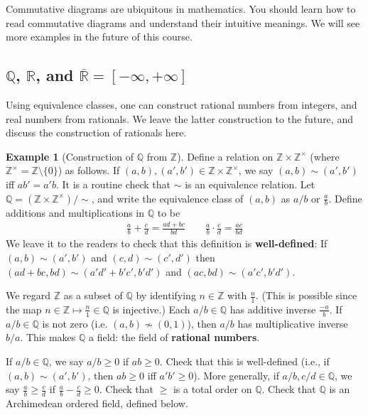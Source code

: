 \documentclass[12pt,b5paper,notitlepage]{article}
\theoremstyle{definition}
\newtheorem{eg}[df]{Example}
\theoremstyle{plain}
\newcommand{\Zbb}{\mathbb Z}
\newcommand{\Qbb}{\mathbb Q}
\newcommand{\Rbb}{\mathbb R}
\numberwithin{equation}{section}
\begin{document}
Commutative diagrams are ubiquitous in mathematics. You should learn how to read commutative diagrams and understand their intuitive meanings. We will see more examples in the future of this course.



\subsection{$\Qbb$, $\Rbb$, and $\overline{\mathbb R}=[-\infty,+\infty]$}



Using equivalence classes, one can construct rational numbers from integers, and real numbers from rationals. We leave the latter construction to the future, and discuss the construction of rationals here.

\begin{eg}[Construction of $\Qbb$ from $\Zbb$]\label{lb17}
Define a relation on $\Zbb\times\Zbb^\times$ (where $\Zbb^\times=\Zbb\setminus\{0\}$) as follows. If $(a,b),(a',b')\in\Zbb\times\Zbb^\times$, we say $(a,b)\sim(a',b')$ iff $ab'=a'b$. It is a routine check that $\sim$ is an equivalence relation. Let \index{Q@$\Qbb$, the field of rational numbers}  $\Qbb=(\Zbb\times\Zbb^\times)/\sim$, and write the equivalence class of $(a,b)$ as $a/b$ or $\frac ab$. Define additions and multiplications in $\Qbb$ to be
\begin{align*}
\frac ab+\frac cd=\frac{ad+bc}{bd}\qquad \frac ab\cdot\frac cd=\frac{ac}{bd}
\end{align*}
We leave it to the readers to check that this definition is  \textbf{well-defined}: If $(a,b)\sim(a',b')$ and $(c,d)\sim(c',d')$ then $(ad+bc,bd)\sim(a'd'+b'c',b'd')$ and $(ac,bd)\sim(a'c',b'd')$.

We regard $\Zbb$ as a subset of $\Qbb$ by identifying $n\in\Zbb$ with $\frac n1$. (This is possible since the map $n\in\Zbb\mapsto \frac n1\in\Qbb$ is injective.) Each $a/b\in\Qbb$ has additive inverse $\frac{-a}b$. If $a/b\in\Qbb$ is not zero (i.e. $(a,b)\nsim (0,1)$), then $a/b$ has multiplicative inverse $b/a$. This makes $\Qbb$ a field: the field of \textbf{rational numbers}.

If $a/b\in\Qbb$, we say $a/b\geq 0$ if $ab\geq0$. Check that this is well-defined (i.e., if $(a,b)\sim(a',b')$, then $ab\geq0$ iff $a'b'\geq0$). More generally, if $a/b,c/d\in\Qbb$, we say $\frac ab\geq \frac cd$ if $\frac ab-\frac cd\geq0$. Check that $\geq$ is a total order on $\Qbb$.  Check that $\Qbb$ is an Archimedean ordered field, defined below.\hfill\qedsymbol
\end{eg}
\end{document}
